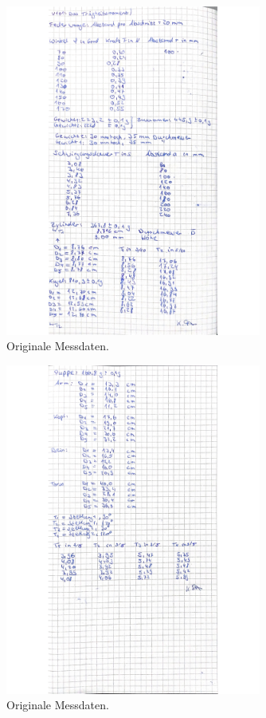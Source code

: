 \begin{figure}[H]
  \centering
  \includegraphics[width=0.75\textwidth]{Bilder/daten1.jpg}
  \caption{Originale Messdaten.}
  \label{fig:daten1}
\end{figure}

\begin{figure}[H]
  \centering
  \includegraphics[width=0.75\textwidth]{Bilder/daten2.jpg}
  \caption{Originale Messdaten.}
  \label{fig:daten2}
\end{figure}